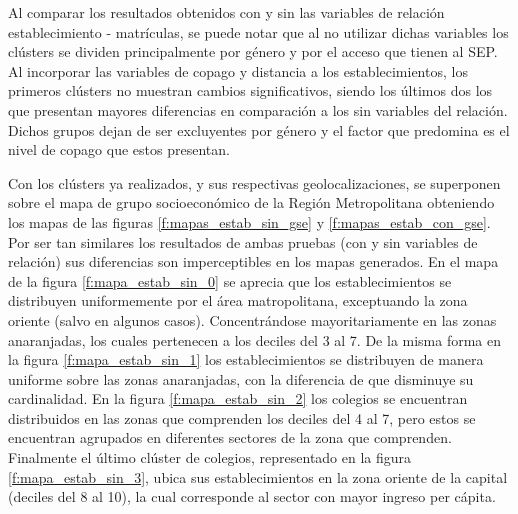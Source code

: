 Al comparar los resultados obtenidos con y sin las variables de relación establecimiento - matrículas, se puede notar que al no utilizar dichas variables los clústers se dividen principalmente por género y por el acceso que tienen al SEP. Al incorporar las variables de copago y distancia a los establecimientos, los primeros clústers no muestran cambios significativos, siendo los últimos dos los que presentan mayores diferencias en comparación a los sin variables del relación. Dichos grupos dejan de ser excluyentes por género y el factor que predomina es el nivel de copago que estos presentan. 

Con los clústers ya realizados, y sus respectivas geolocalizaciones, se superponen sobre el mapa de grupo socioeconómico de la Región Metropolitana obteniendo los mapas de las figuras \ref{f:mapas_estab_sin_gse} y \ref{f:mapas_estab_con_gse}. Por ser tan similares los resultados de ambas pruebas (con y sin variables de relación) sus diferencias son imperceptibles en los mapas generados. En el mapa de la figura \ref{f:mapa_estab_sin_0} se aprecia que los establecimientos se distribuyen uniformemente por el área matropolitana, exceptuando la zona oriente (salvo en algunos casos). Concentrándose mayoritariamente en las zonas anaranjadas, los cuales pertenecen a los deciles del 3 al 7. De la misma forma en la figura \ref{f:mapa_estab_sin_1} los establecimientos se distribuyen de manera uniforme sobre las zonas anaranjadas, con la diferencia de que disminuye su cardinalidad. En la figura \ref{f:mapa_estab_sin_2} los colegios se encuentran distribuidos en las zonas que comprenden los deciles del 4 al 7, pero estos se encuentran agrupados en diferentes sectores de la zona que comprenden. Finalmente el último clúster de colegios, representado en la figura \ref{f:mapa_estab_sin_3}, ubica sus establecimientos en la zona oriente de la capital (deciles del 8 al 10), la cual corresponde al sector con mayor ingreso per cápita. 


